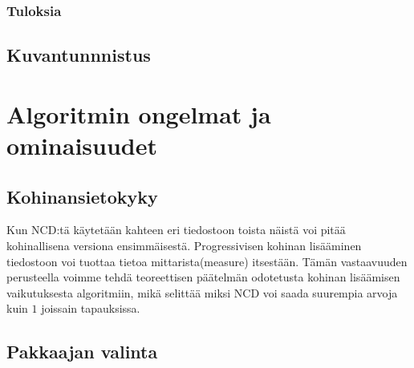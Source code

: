 \documentclass[12pt,finnish,draft]{tktltiki2}
\theoremstyle{definition}
\theoremstyle{remark}
\begin{document}
    \subsubsection{Tuloksia} %
    \label{ssub:tuloksia}

  \subsection{Kuvantunnnistus} %
  \label{sub:kuvantunnnistus}


\section{Algoritmin ongelmat ja ominaisuudet} %
\label{sec:algoritmin_ongelmat_ja_ominaisuudet}
  \subsection{Kohinansietokyky} %
  \label{sub:kohinansietokyky}
    Kun NCD:tä käytetään kahteen eri tiedostoon toista näistä voi pitää kohinallisena versiona ensimmäisestä. Progressivisen kohinan lisääminen tiedostoon voi tuottaa tietoa mittarista(measure) itsestään. Tämän vastaavuuden perusteella voimme tehdä teoreettisen päätelmän odotetusta kohinan lisäämisen vaikutuksesta algoritmiin, mikä selittää miksi NCD voi saada suurempia arvoja kuin $1$ joissain tapauksissa. \cite{4167725}


  \subsection{Pakkaajan valinta} %
  \label{sub:pakkaajan_valinta}

    \iffalse
      TODO: This paper shows that the compressors used to compute the normalized compression distance are not idempotent in some cases, being strongly skewed with the size of the objects and window size, and therefore causing a deviation in the identity property of the distance if we don’t take care that the objects to be compressed fit the windows. The relationship underlying the precision of the distance and the size of the objects has been analyzed for several well-known compressors, and specially in depth for three cases, bzip2, gzip and PPMZ which are examples of the three main types of compressors: block-sorting, Lempel-Ziv, and statistic.
    \fi
\end{document}
